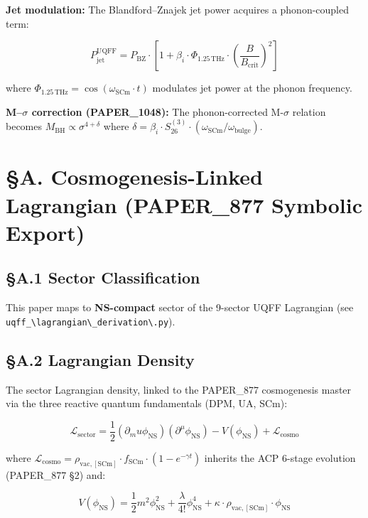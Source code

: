 \documentclass[12pt,a4paper]{article}
\begin{document}
\textbf{Jet modulation:} The Blandford--Znajek jet power acquires a phonon-coupled term:

\begin{equation}
P_{\text{jet}}^{\text{UQFF}} = P_{\text{BZ}} \cdot \left[1 + \beta_i \cdot \Phi_{1.25\,\text{THz}} \cdot \left(\frac{B}{B_{\text{crit}}}\right)^2\right]
\end{equation}

where $\Phi_{1.25\,\text{THz}} = \cos(\omega_{\text{SCm}} \cdot t)$ modulates jet power at the phonon frequency.

\textbf{M--$\sigma$ correction (PAPER\_1048):} The phonon-corrected M-$\sigma$ relation becomes $M_{\text{BH}} \propto \sigma^{4+\delta}$ where $\delta = \beta_i \cdot S_{26}^{(3)} \cdot (\omega_{\text{SCm}}/\omega_{\text{bulge}})$.

\section{\S{}A. Cosmogenesis-Linked Lagrangian (PAPER\_877 Symbolic Export)}

\subsection{\S{}A.1 Sector Classification}

This paper maps to \textbf{NS-compact} sector of the 9-sector UQFF Lagrangian (see \texttt{uqff\_\textbackslash {lagrangian\textbackslash \_derivation\textbackslash }.py}).

\subsection{\S{}A.2 Lagrangian Density}

The sector Lagrangian density, linked to the PAPER\_877 cosmogenesis master via the three reactive quantum fundamentals (DPM, UA, SCm):

\begin{equation}
\mathcal{L}_{\mathrm{sector}} = \frac{1}{2}(\partial_mu \phi_{\mathrm{NS}})(\partial^\mu \phi_{\mathrm{NS}}) - V(\phi_{\mathrm{NS}}) + \mathcal{L}_{\mathrm{cosmo}}
\end{equation}

where $\mathcal{L}_{\mathrm{cosmo}} = \rho_{\mathrm{vac,[SCm]}} \cdot f_{\mathrm{SCm}} \cdot (1 - e^{-\gamma t})$ inherits the ACP 6-stage evolution (PAPER\_877 \S{}2) and:

\begin{equation}
V(\phi_{\mathrm{NS}}) = \frac{1}{2} m^2 \phi_{\mathrm{NS}}^2 + \frac{\lambda}{4!} \phi_{\mathrm{NS}}^4 + \kappa \cdot \rho_{\mathrm{vac,[SCm]}} \cdot \phi_{\mathrm{NS}}
\end{equation}
\end{document}
